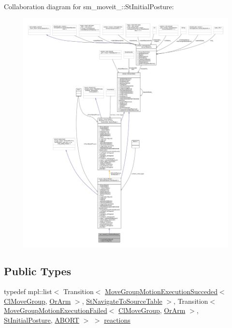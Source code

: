 Collaboration diagram for sm\+\_\+moveit\+\_\+:\+:St\+Initial\+Posture\+:
\nopagebreak
\begin{figure}[H]
\begin{center}
\leavevmode
\includegraphics[width=350pt]{structsm__moveit__4_1_1StInitialPosture__coll__graph}
\end{center}
\end{figure}
\subsection*{Public Types}
\begin{DoxyCompactItemize}
\item 
typedef mpl\+::list$<$ Transition$<$ \hyperlink{structmoveit__z__client_1_1MoveGroupMotionExecutionSucceded}{Move\+Group\+Motion\+Execution\+Succeded}$<$ \hyperlink{classmoveit__z__client_1_1ClMoveGroup}{Cl\+Move\+Group}, \hyperlink{classsm__moveit__4_1_1OrArm}{Or\+Arm} $>$, \hyperlink{structsm__moveit__4_1_1StNavigateToSourceTable}{St\+Navigate\+To\+Source\+Table} $>$, Transition$<$ \hyperlink{structmoveit__z__client_1_1MoveGroupMotionExecutionFailed}{Move\+Group\+Motion\+Execution\+Failed}$<$ \hyperlink{classmoveit__z__client_1_1ClMoveGroup}{Cl\+Move\+Group}, \hyperlink{classsm__moveit__4_1_1OrArm}{Or\+Arm} $>$, \hyperlink{structsm__moveit__4_1_1StInitialPosture}{St\+Initial\+Posture}, \hyperlink{classABORT}{A\+B\+O\+RT} $>$ $>$ \hyperlink{structsm__moveit__4_1_1StInitialPosture_aba6b4f6994263b0b57c50986b9db3497}{reactions}
\end{DoxyCompactItemize}
